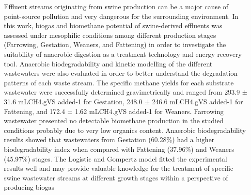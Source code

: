 Effluent streams originating from swine production can be a major cause of point-source pollution and very dangerous for the surrounding environment. In this work, biogas and biomethane potential of swine-derived effluents was assessed under mesophilic conditions among different production stages (Farrowing, Gestation, Weaners, and Fattening) in order to investigate the suitability of anaerobic digestion as a treatment technology and energy recovery tool. Anaerobic biodegradability and kinetic modelling of the different wastewaters were also evaluated in order to better understand the degradation patterns of each waste stream. The specific methane yields for each substrate wastewater were successfully determined gravimetrically and ranged from 293.9 ± 31.6 mLCH4.gVS added-1 for Gestation, 248.0 ± 246.6 mLCH4.gVS added-1 for Fattening, and 172.4 ± 1.62 mLCH4.gVS added-1 for Weaners. Farrowing wastewater presented no detectable biomethane production in the studied conditions probably due to very low organics content.  Anaerobic biodegradability results showed that wastewaters from Gestation (60.28\%) had a higher biodegradability index when compared with Fattening (37.96\%) and Weaners (45.97\%) stages. The Logistic and Gompertz model fitted the experimental results well and may provide valuable knowledge for the treatment of specific swine wastewater streams at different growth stages within a perspective of producing biogas